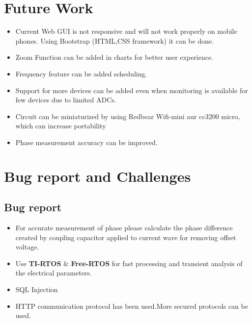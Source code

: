 \documentclass[a4paper,12pt,oneside]{book}
\begin{document}
\section{Future Work}
\begin{itemize}
	\item{Current Web GUI is not responsive and will not work properly on mobile phones. Using Bootstrap (HTML,CSS framework) it can be done.}
	\item{Zoom Function can be added in charts for better user experience.}
	\item{Frequency feature can be added scheduling.}
	\item {Support for more devices can be added even when monitoring is available for few devices due to limited ADCs. }
	\item{Circuit can be miniaturized by using Redbear Wifi-mini aur cc3200 micro, which can increase portability}
	\item{Phase measurement accuracy can be improved.}
	
\end{itemize}
\newpage
\section{Bug report and Challenges}
\subsection*{Bug report}
\begin{itemize}
	\item For accurate measurement of phase please calculate the phase difference created by coupling capacitor applied to current wave for removing offset voltage.
	\item Use \textbf{TI-RTOS} \& \textbf{Free-RTOS} for fast processing and transient analysis of the electrical parameters.
	\item{SQL Injection }
	\item{HTTP communication protocol has been used.More secured protocols can be used.}
\end{itemize}
\end{document}
